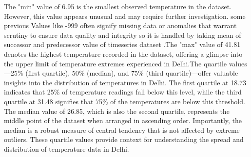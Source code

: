\documentclass[sn-mathphys,Numbered]{sn-jnl}
\theoremstyle{thmstyleone}
\theoremstyle{thmstyletwo}
\theoremstyle{thmstylethree}
\begin{document}
The "min" value of 6.95 is the smallest observed temperature in the dataset. However, this value appears unusual and may require further investigation. some previous Values like -999 often signify missing data or anomalies that warrant scrutiny to ensure data quality and integrity so it is handled by taking mean of successor and predecessor value of timeseries dataset .The "max" value of 41.81 denotes the highest temperature recorded in the dataset, offering a glimpse into the upper limit of temperature extremes experienced in Delhi.The quartile values—25\% (first quartile), 50\% (median), and 75\% (third quartile)—offer valuable insights into the distribution of temperatures in Delhi. The first quartile at 18.73 indicates that 25\% of temperature readings fall below this level, while the third quartile at 31.48 signifies that 75\% of the temperatures are below this threshold. The median value of 26.85, which is also the second quartile, represents the middle point of the dataset when arranged in ascending order. Importantly, the median is a robust measure of central tendency that is not affected by extreme outliers. These quartile values provide context for understanding the spread and distribution of temperature data in Delhi.
\end{document}
